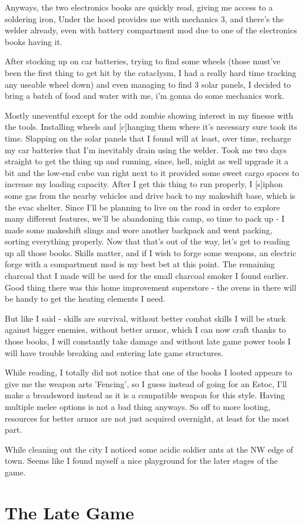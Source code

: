 Anyways, the two electronics books are quickly read, giving me access to a soldering iron, Under the hood provides me with mechanics 3, and there's the welder already, even with battery compartment mod due to one of the electronics books having it.

After stocking up on car batteries, trying to find some wheels (those must've been the first thing to get hit by the cataclysm, I had a really hard time tracking any useable wheel down) and even managing to find 3 solar panels, I decided to bring a batch of food and water with me, i'm gonna do some mechanics work.

Mostly uneventful except for the odd zombie showing interest in my finesse with the tools. Installing wheels and [c]hanging them where it's necessary sure took its time. Slapping on the solar panels that I found will at least, over time, recharge my car batteries that I'm inevitably drain using the welder. Took me two days straight to get the thing up and running, since, hell, might as well upgrade it a bit and the low-end cube van right next to it provided some sweet cargo spaces to increase my loading capacity. After I get this thing to run properly, I [s]iphon some gas from the nearby vehicles and drive back to my makeshift base, which is the evac shelter. Since I'll be planning to live on the road in order to explore many different features, we'll be abandoning this camp, so time to pack up - I made some makeshift slings and wore another backpack and went packing, sorting everything properly. Now that that's out of the way, let's get to reading up all those books. Skills matter, and if I wish to forge some weapons, an electric forge with a compartment mod is my best bet at this point. The remaining charcoal that I made will be used for the small charcoal smoker I found earlier. Good thing there was this home improvement superstore - the ovens in there will be handy to get the heating elements I need.

But like I said - skills are survival, without better combat skills I will be stuck against bigger enemies, without better armor, which I can now craft thanks to those books, I will constantly take damage and without late game power tools I will have trouble breaking and entering late game structures.

While reading, I totally did not notice that one of the books I looted appears to give me the weapon arts 'Fencing', so I guess instead of going for an Estoc, I'll make a broadsword instead as it is a compatible weapon for this style. Having multiple melee options is not a bad thing anyways. So off to more looting, resources for better armor are not just acquired overnight, at least for the most part.

While cleaning out the city I noticed some acidic soldier ants at the NW edge of town. Seems like I found myself a nice playground for the later stages of the game.

\section{The Late Game}